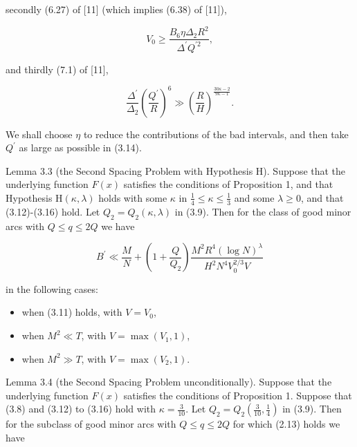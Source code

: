 \documentclass[10pt]{article}
\begin{document}
secondly (6.27) of [11] (which implies (6.38) of [11]),


\begin{equation*}
V_{0} \geqslant \frac{B_{6} \eta \Delta_{2} R^{2}}{\Delta^{\prime} Q^{\prime 2}}, \tag{3.15}
\end{equation*}


and thirdly (7.1) of [11],


\begin{equation*}
\frac{\Delta^{\prime}}{\Delta_{2}}\left(\frac{Q^{\prime}}{R}\right)^{6} \gg\left(\frac{R}{H}\right)^{\frac{30 \kappa-2}{9 \kappa-1}}. \tag{3.16}
\end{equation*}


We shall choose $\eta$ to reduce the contributions of the bad intervals, and then take $Q^{\prime}$ as large as possible in (3.14).

Lemma 3.3 (the Second Spacing Problem with Hypothesis H). Suppose that the underlying function $F(x)$ satisfies the conditions of Proposition 1, and that Hypothesis $\mathrm{H}(\kappa, \lambda)$ holds with some $\kappa$ in $\frac{1}{4} \leqslant \kappa \leqslant \frac{1}{3}$ and some $\lambda \geqslant 0$, and that (3.12)-(3.16) hold. Let $Q_{2}=Q_{2}(\kappa, \lambda)$ in (3.9). Then for the class of good minor arcs with $Q \leqslant q \leqslant 2 Q$ we have


\begin{equation*}
B^{\prime} \ll \frac{M}{N}+\left(1+\frac{Q}{Q_{2}}\right) \frac{M^{2} R^{4}(\log N)^{\lambda}}{H^{2} N^{4} V_{0}^{2 / 3} V} \tag{3.17}
\end{equation*}


in the following cases:

\begin{itemize}
  \item[(A)] when (3.11) holds, with $V=V_{0}$,
  \item[(B)] when $M^{2} \ll T$, with $V=\max \left(V_{1}, 1\right)$,
  \item[(C)] when $M^{2} \gg T$, with $V=\max \left(V_{2}, 1\right)$.
\end{itemize}

Lemma 3.4 (the Second Spacing Problem unconditionally). Suppose that the underlying function $F(x)$ satisfies the conditions of Proposition 1. Suppose that (3.8) and (3.12) to (3.16) hold with $\kappa=\frac{3}{10}$. Let $Q_{2}=Q_{2}\left(\frac{3}{10}, \frac{1}{4}\right)$ in (3.9). Then for the subclass of good minor arcs with $Q \leqslant q \leqslant 2 Q$ for which (2.13) holds we have
\end{document}
